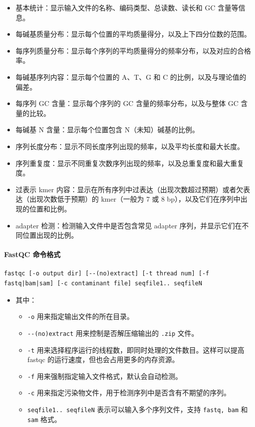 \documentclass[UTF8]{ctexart}
\begin{document}
\begin{itemize}
	\item 基本统计：显示输入文件的名称、编码类型、总读数、读长和 GC 含量等信息。
	\item 每碱基质量分布：显示每个位置的平均质量得分，以及上下四分位数的范围。
	\item 每序列质量分布：显示每个序列的平均质量得分的频率分布，以及对应的合格率。
	\item 每碱基序列内容：显示每个位置的 A、T、G 和 C 的比例，以及与理论值的偏差。
	\item 每序列 GC 含量：显示每个序列的 GC 含量的频率分布，以及与整体 GC 含量的比较。
	\item 每碱基 N 含量：显示每个位置包含 N（未知）碱基的比例。
	\item 序列长度分布：显示不同长度序列出现的频率，以及平均长度和最大长度。
	\item 序列重复度：显示不同重复次数序列出现的频率，以及总重复度和最大重复度。
	\item 过表示 kmer 内容：显示在所有序列中过表达（出现次数超过预期）或者欠表达（出现次数低于预期）的 kmer（一般为 7 或 8 bp），以及它们在序列中出现的位置和比例。
	\item adapter 检测：检测输入文件中是否包含常见 adapter 序列，并显示它们在不同位置出现的比例。
	
\end{itemize}

\paragraph*{FastQC 命令格式}

\begin{lstlisting}
fastqc [-o output dir] [--(no)extract] [-t thread num] [-f fastq|bam|sam] [-c contaminant file] seqfile1.. seqfileN
\end{lstlisting}

\begin{itemize}
	\item 其中：
	\begin{itemize}
		\item \verb|-o| 用来指定输出文件的所在目录。
		\item \verb|--(no)extract| 用来控制是否解压缩输出的 \verb|.zip| 文件。
		\item \verb|-t| 用来选择程序运行的线程数，即同时处理的文件数目。这样可以提高 fastqc 的运行速度，但也会占用更多的内存资源。
		\item \verb|-f| 用来强制指定输入文件格式，默认会自动检测。
		\item \verb|-c| 用来指定污染物文件，用于检测序列中是否含有不期望的序列。
		\item \verb|seqfile1.. seqfileN| 表示可以输入多个序列文件，支持 \verb|fastq, bam| 和 \verb|sam| 格式。
	\end{itemize}
\end{itemize}
\end{document}
